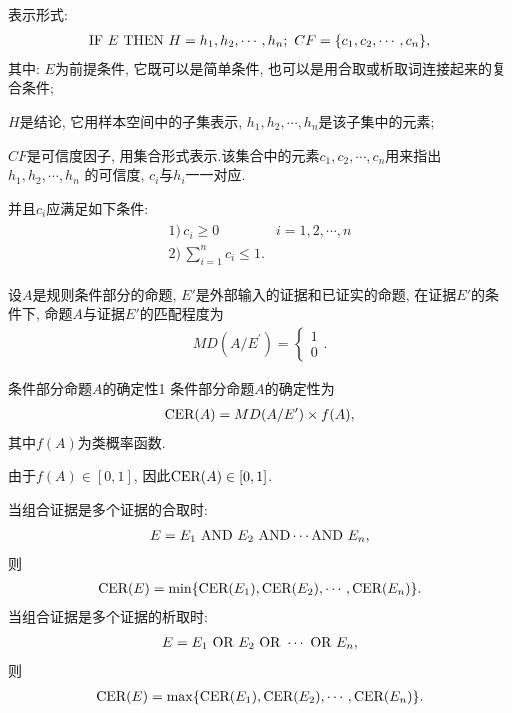 表示形式:
\begin{align}
  \textup{IF}\,\,   E\,\,   \textup{THEN} \,\,   H={h_1, h_2, \cdots, h_n}; \,\, CF=\{c_1, c_2, \cdots, c_n\},
\end{align}
其中:
     $E$为前提条件, 它既可以是简单条件, 也可以是用合取或析取词连接起来的复合条件;

     $H$是结论, 它用样本空间中的子集表示,  $h_1, h_2, \cdots, h_n$是该子集中的元素;

     $CF$是可信度因子, 用集合形式表示.该集合中的元素$c_1, c_2, \cdots, c_n$用来指出$h_1, h_2, \cdots, h_n$ 的可信度, $c_i$与$h_i$一一对应.

 并且$c_i$应满足如下条件:
\begin{align}
 \begin{array}{ll}
   1)\, c_{i} \geq 0 & i=1,2, \cdots, n \\
   2)\, \sum_{i=1}^{n} c_{i} \leq 1.&
 \end{array}
\end{align}

\begin{example}
设$A$是规则条件部分的命题, $E'$是外部输入的证据和已证实的命题, 在证据$E'$的条件下, 命题$A$与证据$E'$的匹配程度为
\begin{align}
  MD\left(A / E^{\prime}\right)=
  \left\{
  \begin{array}{l}
  1 \\
  0\end{array}
  \right..
\end{align}
\vspace{-0.2cm}
\end{example}

\begin{mydef}{条件部分命题$A$的确定性}{1}
条件部分命题$A$的确定性为
\begin{align}
  \textup{CER}(A)=MD(A/E')\times f(A),
\end{align}
其中$f(A)$为类概率函数.
\end{mydef}
由于$f(A) \in [0, 1]$, 因此$\textup{CER}(A)\in [0,  1]$.

当组合证据是多个证据的合取时:
\begin{align}
  E=E_1\,\,  \textup{AND}\,\,  E_2 \,\, \textup{AND} \cdots  \textup{AND} \,\,  E_n,
\end{align}
则
\begin{align}
  \textup{CER}(E)=\min\{\textup{CER}(E_1), \textup{CER}(E_2), \cdots,\textup{CER}(E_n)\}.
\end{align}
    当组合证据是多个证据的析取时:
\begin{align}
  E=E_1\,\, \textup{OR} \,\, E_2 \,\,  \textup{OR}\,\,\cdots \,\, \textup{OR}\,\,  E_n,
\end{align}
则
\begin{align}
  \textup{CER}(E)=\max\{\textup{CER}(E_1), \textup{CER}(E_2),\cdots, \textup{CER}(E_n)\}.
\end{align}

